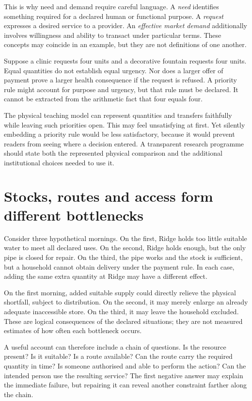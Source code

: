This is why need and demand require careful language. A \emph{need} identifies something required for a declared human or functional purpose. A \emph{request} expresses a desired service to a provider. An \emph{effective market demand} additionally involves willingness and ability to transact under particular terms. These concepts may coincide in an example, but they are not definitions of one another.

Suppose a clinic requests four units and a decorative fountain requests four units. Equal quantities do not establish equal urgency. Nor does a larger offer of payment prove a larger health consequence if the request is refused. A priority rule might account for purpose and urgency, but that rule must be declared. It cannot be extracted from the arithmetic fact that four equals four.

The physical teaching model can represent quantities and transfers faithfully while leaving such priorities open. This may feel unsatisfying at first. Yet silently embedding a priority rule would be less satisfactory, because it would prevent readers from seeing where a decision entered. A transparent research programme should state both the represented physical comparison and the additional institutional choices needed to use it.

\section{Stocks, routes and access form different bottlenecks}
Consider three hypothetical mornings. On the first, Ridge holds too little suitable water to meet all declared uses. On the second, Ridge holds enough, but the only pipe is closed for repair. On the third, the pipe works and the stock is sufficient, but a household cannot obtain delivery under the payment rule. In each case, adding the same extra quantity at Ridge may have a different effect.

On the first morning, added suitable supply could directly relieve the physical shortfall, subject to distribution. On the second, it may merely enlarge an already adequate inaccessible store. On the third, it may leave the household excluded. These are logical consequences of the declared situations; they are not measured estimates of how often each bottleneck occurs.

A useful account can therefore include a chain of questions. Is the resource present? Is it suitable? Is a route available? Can the route carry the required quantity in time? Is someone authorised and able to perform the action? Can the intended person use the resulting service? The first negative answer may explain the immediate failure, but repairing it can reveal another constraint farther along the chain.

